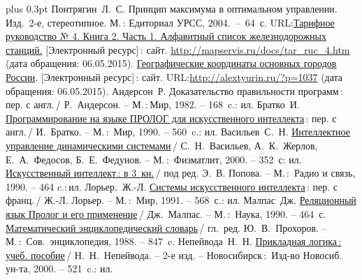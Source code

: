 \documentclass[a4paper,14pt, openany, twoside, draft]{extbook} %
\def\emphbib#1{#1} %
\begin{document}
\begin{thebibliography}{99}\itemsep1pt \parskip 0pt plus 0.3pt
 Понтрягин~Л.~С. Принцип максимума в оптимальном управлении. Изд.~2-е, стереотипное. М.\,: Едиториал УРСС,  2004.~--~64~с.
 URL:\href{http://mapservis.ru/docs/tar_ruc_4.htm}{Тарифное руководство № 4. Книга 2. Часть 1. Алфавитный список железнодорожных станций.} [Электронный ресурс]\,{}: сайт. \url{http://mapservis.ru/docs/tar_ruc_4.htm} (дата обращения: 06.05.2015).
 \href{http://alextyurin.ru/?p=1037}{Географические координаты основных городов России}. [Электронный ресурс]\,{}: сайт. URL:\url{http://alextyurin.ru/?p=1037} (дата обращения: 06.05.2015).
 Андерсон~Р. \emphbib{Доказательство правильности программ}\,{}: пер. с англ.\,{}/ Р.~Андерсон. -- М.\,:\,Мир, 1982. -- 168~c.: ил.
 Братко~И. \emphbib{\href{http://royallib.ru/book/bratko_ivan/programmirovanie_na_yazike_prolog_dlya_iskusstvennogo_intellekta.html}{Программирование на языке ПРОЛОГ для искусственного интеллекта}}\,{}: пер. с англ.\,/ И.~Братко. -- М.\,:~Мир, 1990. -- 560~c.: ил.
 Васильев~С.~Н. \emphbib{\href{http://bookfi.org/book/616050}{Интеллектное управление динамическими системами}}\,{}/ С.~Н.~Васильев, А.~К.~Жерлов, Е.~А.~Федосов, Б.~Е.~Федунов. -- М.\,:~Физматлит, 2000. -- 352~с: ил.
 \emphbib{\href{http://aihandbook.intsys.org.ru/index.php/intro/ai-handbook}{Искусственный интеллект\,{}: в 3~кн.}}\,{}/ под ред. Э.~В. Попова. -- М.\,:~Радио и связь, 1990. -- 464 c.:\,{}ил.
 Лорьер.~Ж.-Л.  \emphbib{\href{http://publ.lib.ru/ARCHIVES/L/LOR'ER_Jan_Lui/_Lor'er_J.L..html}{Системы искусственного интеллекта}\,{}: пер. с франц.}\,{}/ Ж.-Л. Лорьер. -- М.\,:~Мир, 1991. -- 568~с.: ил.
 Малпас~Дж. \emphbib{\href{http://padaread.com/?book=40731&pg=1}{Реляционный язык Пролог и его применение}}\,{}/ Дж.~Малпас. -- М.\,:~Наука, 1990. -- 464~с.
 \emphbib{\href{https://app.box.com/shared/793ukgvblxmj0hh6btw4}{Математический энциклопедический словарь}}\,{}/ гл.~ред. Ю.~В.~Прохоров. -- М.\,:~Сов.~энциклопедия, 1988. -- 847~c.
 Непейвода~Н.~Н. \emphbib{\href{http://www.logic-books.info/taxonomy/term/215}{Прикладная логика\,{}: учеб. пособие}}\,{}/ Н.~Н.~Непейвода. -- 2-е изд. -- Новосибирск\,{}:~Изд-во Новосиб. ун-та, 2000. -- 521~c.: ил.

\end{thebibliography}
\end{document}
